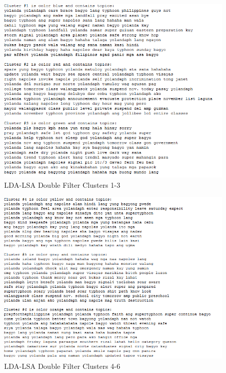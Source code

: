 \begin{figure}
    \centering
    \includegraphics[width=\textwidth, height=\textheight,keepaspectratio]{Method1Cluster1.PNG}
    \caption{LDA-LSA Double Filter Clusters 1-3}
    \label{fig:my_label3}
\end{figure}


\begin{figure}
    \centering
    \includegraphics[width=\textwidth, height=\textheight,keepaspectratio]{Method1Cluster2.PNG}
    \caption{LDA-LSA Double Filter Clusters 4-6}
    \label{fig:my_label4}
\end{figure}

